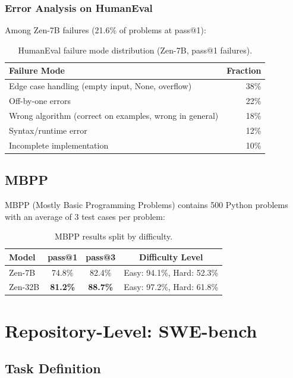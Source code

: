 \documentclass[11pt,a4paper]{article}
\begin{document}
\subsubsection{Error Analysis on HumanEval}

Among Zen-7B failures (21.6\% of problems at pass@1):

\begin{table}[H]
\centering
\begin{tabular}{lr}
\toprule
\textbf{Failure Mode} & \textbf{Fraction} \\
\midrule
Edge case handling (empty input, None, overflow) & 38\% \\
Off-by-one errors & 22\% \\
Wrong algorithm (correct on examples, wrong in general) & 18\% \\
Syntax/runtime error & 12\% \\
Incomplete implementation & 10\% \\
\bottomrule
\end{tabular}
\caption{HumanEval failure mode distribution (Zen-7B, pass@1 failures).}
\end{table}

\subsection{MBPP}

MBPP (Mostly Basic Programming Problems) contains 500 Python problems with an
average of 3 test cases per problem:

\begin{table}[H]
\centering
\begin{tabular}{lccc}
\toprule
\textbf{Model} & \textbf{pass@1} & \textbf{pass@3} & \textbf{Difficulty Level} \\
\midrule
Zen-7B & 74.8\% & 82.4\% & Easy: 94.1\%, Hard: 52.3\% \\
Zen-32B & \textbf{81.2\%} & \textbf{88.7\%} & Easy: 97.2\%, Hard: 61.8\% \\
\bottomrule
\end{tabular}
\caption{MBPP results split by difficulty.}
\end{table}

\section{Repository-Level: SWE-bench}

\subsection{Task Definition}
\end{document}
